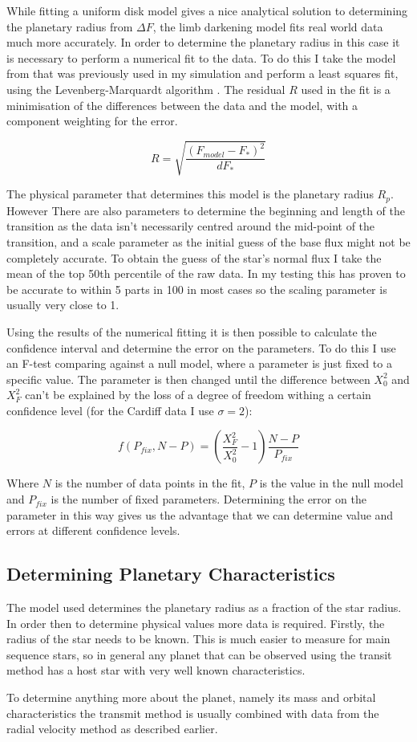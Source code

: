 While fitting a uniform disk model gives a nice analytical solution to determining the planetary radius from $\Delta F$, the limb darkening model fits real world data much more accurately. In order to determine the planetary radius in this case it is necessary to perform a numerical fit to the data. To do this I take the model from \cite{mandel2002analytic} that was previously used in my simulation and perform a least squares fit, using the Levenberg-Marquardt algorithm \citep{more1978levenberg}. The residual $R$ used in the fit is a minimisation of the differences between the data and the model, with a component weighting for the error.

\[ R = \sqrt{ \frac{ \left( F_{model} - F_* \right)^2 }{dF_*} } \]

The physical parameter that determines this model is the planetary radius $R_p$. However There are also parameters to determine the  beginning and length of the transition as the data isn't necessarily centred around the mid-point of the transition, and a scale parameter as the initial guess of the base flux might not be completely accurate. To obtain the guess of the star's normal flux I take the mean of the top 50th percentile of the raw data. In my testing this has proven to be accurate to within 5 parts in 100 in most cases so the scaling parameter is usually very close to 1.

Using the results of the numerical fitting it is then possible to calculate the confidence interval and determine the error on the parameters. To do this I use an F-test comparing against a null model, where a parameter is just fixed to a specific value. The parameter is then changed until the difference between $X_0^2$ and $X_F^2$ can't be explained by the loss of a degree of freedom withing a certain confidence level (for the Cardiff data I use $\sigma=2$):

\[ f(P_{fix},N-P) =\left( \frac{X_F^2}{X_0^2} - 1 \right)\frac{N-P}{P_{fix}} \]

Where $N$ is the number of data points in the fit, $P$ is the value in the null model and $P_{fix}$ is the number of fixed parameters. Determining the error on the parameter in this way gives us the advantage that we can determine value and errors at different confidence levels.

\subsection{Determining Planetary Characteristics}

The model used determines the planetary radius as a fraction of the star radius. In order then to determine physical values more data is required. Firstly, the radius of the star needs to be known. This is much easier to measure for main sequence stars, so in general any planet that can be observed using the transit method has a host star with very well known characteristics.

To determine anything more about the planet, namely its mass and orbital characteristics the transmit method is usually combined with data from the radial velocity method as described earlier.
